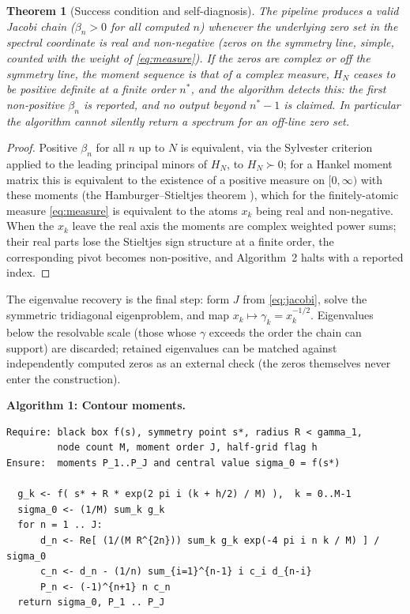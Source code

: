 \documentclass[11pt]{article}
\newtheorem{theorem}{Theorem}
\theoremstyle{definition}
\begin{document}
\begin{theorem}[Success condition and self-diagnosis]\label{thm:positivity}
The pipeline produces a valid Jacobi chain ($\beta_n>0$ for all
computed $n$) whenever the underlying zero set in the spectral
coordinate is real and non-negative (zeros on the symmetry line,
simple, counted with the weight of \eqref{eq:measure}). If the
zeros are complex or off the symmetry line, the moment sequence is
that of a complex measure, $H_N$ ceases to be positive definite at a
finite order $n^\ast$, and the algorithm detects this: the first
non-positive $\beta_n$ is reported, and no output beyond
$n^\ast-1$ is claimed. In particular the algorithm cannot silently
return a spectrum for an off-line zero set.
\end{theorem}

\begin{proof}
Positive $\beta_n$ for all $n$ up to $N$ is equivalent, via the
Sylvester criterion applied to the leading principal minors of $H_N$,
to $H_N\succ0$; for a Hankel moment matrix this is equivalent to the
existence of a positive measure on $[0,\infty)$ with these moments
(the Hamburger--Stieltjes theorem \cite[Ch.~1]{ShohatTamarkin}),
which for the finitely-atomic measure \eqref{eq:measure} is
equivalent to the atoms $x_k$ being real and non-negative. When the
$x_k$ leave the real axis the moments are complex weighted power
sums; their real parts lose the Stieltjes sign structure at a finite
order, the corresponding pivot becomes non-positive, and
Algorithm~2 halts with a reported index.
\end{proof}

The eigenvalue recovery is the final step: form $J$ from
\eqref{eq:jacobi}, solve the symmetric tridiagonal eigenproblem, and
map $x_k\mapsto\gamma_k=x_k^{-1/2}$. Eigenvalues below the
resolvable scale (those whose $\gamma$ exceeds the order the chain
can support) are discarded; retained eigenvalues can be matched
against independently computed zeros as an external check (the
zeros themselves never enter the construction).

\noindent\textbf{Algorithm 1: Contour moments.}\par\smallskip
\begin{lstlisting}
Require: black box f(s), symmetry point s*, radius R < gamma_1,
         node count M, moment order J, half-grid flag h
Ensure:  moments P_1..P_J and central value sigma_0 = f(s*)

  g_k <- f( s* + R * exp(2 pi i (k + h/2) / M) ),  k = 0..M-1
  sigma_0 <- (1/M) sum_k g_k
  for n = 1 .. J:
      d_n <- Re[ (1/(M R^{2n})) sum_k g_k exp(-4 pi i n k / M) ] / sigma_0
      c_n <- d_n - (1/n) sum_{i=1}^{n-1} i c_i d_{n-i}
      P_n <- (-1)^{n+1} n c_n
  return sigma_0, P_1 .. P_J
\end{lstlisting}
\end{document}
